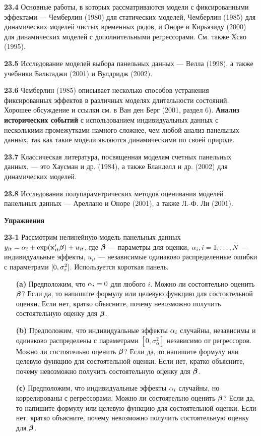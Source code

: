 \textbf{23.4} Основные работы, в которых рассматриваются модели с фиксированными эффектами --- Чемберлин (1980) для статических моделей, Чемберлин (1985) для динамических моделей чистых временных рядов, и Оноре и Кирьязиду (2000) для динамических моделей с дополнительными регрессорами. См. также Хсяо (1995).

\textbf{23.5} Исследование моделей выбора панельных данных --- Велла (1998), а также учебники Бальтаджи (2001) и Вулдридж (2002).

\textbf{23.6} Чемберлин (1985) описывает несколько способов устранения фиксированных эффектов в различных моделях длительности состояний. Хорошее обсуждение и ссылки см. в Ван ден Берг (2001, раздел 6). \textbf{Анализ исторических событий} с использованием индивидуальных данных с несколькими промежутками намного сложнее, чем любой анализ панельных данных, так как такие модели являются динамическими по своей природе.

\textbf{23.7} Классическая литература, посвященная моделям счетных панельных данных, --- это Хаусман и др. (1984), а также Бланделл и др. (2002) для динамических моделей.

\textbf{23.8} Исследования полупараметрических методов оценивания моделей панельных данных --- Ареллано и Оноре (2001), а также Л.-Ф. Ли (2001).

{\centering \textbf{Упражнения} \\}

\textbf{23-1} Рассмотрим нелинейную модель панельных данных $y_{it} = \alpha_i+ \exp (\mathbf{x}'_{it}\bm{\beta})+u_{it}$, где $\bm{\beta}$ --- параметры для оценки, $\alpha_i, i=1, \dots, N$ --- индивидуальные эффекты, $u_{it}$ --- независимые одинаково распределенные ошибки с параметрами $[0, \sigma^2_{\varepsilon}]$. Используется короткая панель.
\begin{itemize}
\item[{\bf (a)}] Предположим, что $\alpha_i=0$ для любого $i$. Можно ли состоятельно оценить $\bm{\beta}$? Если да, то напишите формулу или целевую функцию для состоятельной оценки. Если нет, кратко объясните, почему невозможно получить состоятельную оценку для $\bm{\beta}$.
\item[{\bf (b)}] Предположим, что индивидуальные эффекты $\alpha_i$ случайны, независимы и одинаково распределены с параметрами $[0, \sigma^2_{\alpha}]$ независимо от регрессоров. Можно ли состоятельно оценить $\bm{\beta}$? Если да, то напишите формулу или целевую функцию для состоятельной оценки. Если нет, кратко объясните, почему невозможно получить состоятельную оценку для $\bm{\beta}$.
\item[{\bf (с)}] Предположим, что индивидуальные эффекты $\alpha_i$ случайны, но коррелированы с регрессорами. Можно ли состоятельно оценить $\bm{\beta}$? Если да, то напишите формулу или целевую функцию для состоятельной оценки. Если нет, кратко объясните, почему невозможно получить состоятельную оценку для $\bm{\beta}$.
\end{itemize}

